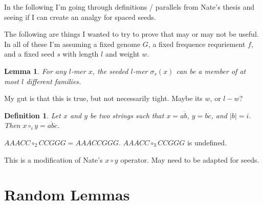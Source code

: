 \documentclass{article}
\newtheorem{definition}{Definition}
\newtheorem{lemma}{Lemma}
\begin{document}
In the following I'm going through definitions / parallels from Nate's
thesis and seeing if I can create an analgy for spaced seeds.

The following are things I wanted to try to prove that may or may not
be useful.  In all of these I'm assuming a fixed genome $G$, a fixed
frequence requriement $f$, and a fixed seed $s$ with length $l$ and
weight $w$.

\begin{lemma} 
For any $l$-mer $x$, the seeded $l$-mer $\sigma_s(x)$ can be a member
of at most $l$ different families.
\end{lemma}
My gut is that this is true, but not necessarily tight.  Maybe its
$w$, or $l-w$?

\begin{definition}
Let $x$ and $y$ be two strings such that $x = a \dot b$, $y = b \dot
c$, and $|b| = i$.  Then $x \circ_i y = a\dot b \dot c$.
\end{definition}

$AAACC \circ_2 CCGGG = AAACCGGG$.  $AAACC \circ_3 CCGGG$ is undefined.

This is a modification of Nate's $x \circ y$ operator.  May need to be
adapted for seeds.






  
\section{Random Lemmas}
\end{document}
